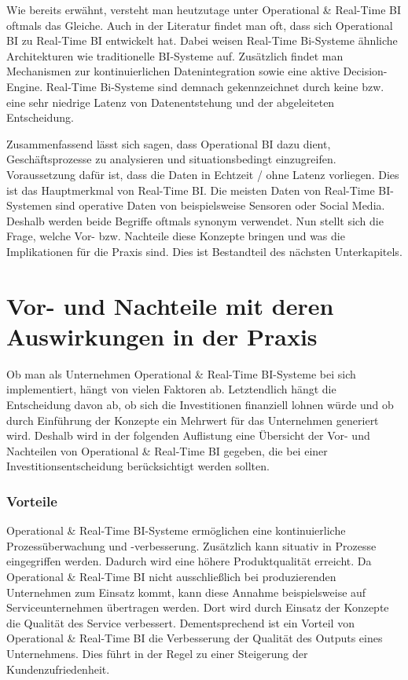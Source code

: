 Wie bereits erwähnt, versteht man heutzutage unter Operational \& Real-Time BI oftmals das Gleiche. Auch in der Literatur findet man oft, dass sich Operational BI zu Real-Time BI entwickelt hat. \autocite[Vgl.][S. 36]{Sandu2008} Dabei weisen Real-Time Bi-Systeme ähnliche Architekturen wie traditionelle BI-Systeme auf. Zusätzlich findet man Mechanismen zur kontinuierlichen Datenintegration sowie eine aktive Decision-Engine. \autocite[Vgl.][S. 96]{chaud} Real-Time Bi-Systeme sind demnach gekennzeichnet durch keine bzw. eine sehr niedrige Latenz von Datenentstehung und der abgeleiteten Entscheidung.

Zusammenfassend lässt sich sagen, dass Operational BI dazu dient, Geschäftsprozesse zu analysieren und situationsbedingt einzugreifen. Voraussetzung dafür ist, dass die Daten in Echtzeit / ohne Latenz vorliegen. Dies ist das Hauptmerkmal von Real-Time BI. Die meisten Daten von Real-Time BI-Systemen sind operative Daten von beispielsweise Sensoren oder Social Media. Deshalb werden beide Begriffe oftmals synonym verwendet. Nun stellt sich die Frage, welche Vor- bzw. Nachteile diese Konzepte bringen und was die Implikationen für die Praxis sind. Dies ist Bestandteil des nächsten Unterkapitels.

\section{Vor- und Nachteile mit deren Auswirkungen in der Praxis}
Ob man als Unternehmen Operational \& Real-Time BI-Systeme bei sich implementiert, hängt von vielen Faktoren ab. Letztendlich hängt die Entscheidung davon ab, ob sich die Investitionen finanziell lohnen würde und ob durch Einführung der Konzepte ein Mehrwert für das Unternehmen generiert wird. Deshalb wird in der folgenden Auflistung eine Übersicht der Vor- und Nachteilen von Operational \& Real-Time BI gegeben, die bei einer Investitionsentscheidung berücksichtigt werden sollten.  
\subsubsection{Vorteile}
Operational \& Real-Time BI-Systeme ermöglichen eine kontinuierliche Prozessüberwachung und -verbesserung. Zusätzlich kann situativ in Prozesse eingegriffen werden. Dadurch wird eine höhere Produktqualität erreicht. \autocite[Vgl.][S. 30]{Hanel} Da Operational \& Real-Time BI nicht ausschließlich bei produzierenden Unternehmen zum Einsatz kommt, kann diese Annahme beispielsweise auf Serviceunternehmen übertragen werden. Dort wird durch Einsatz der Konzepte die Qualität des Service verbessert. Dementsprechend ist ein Vorteil von Operational \& Real-Time BI die Verbesserung der Qualität des Outputs eines Unternehmens. Dies führt in der Regel zu einer Steigerung der Kundenzufriedenheit.

